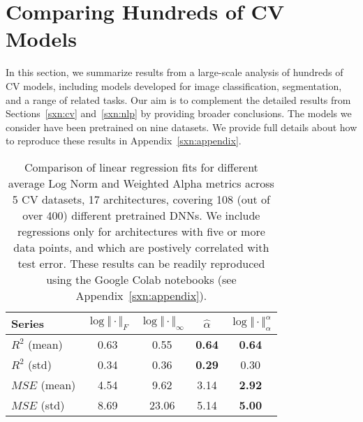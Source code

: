 \section{Comparing Hundreds of CV Models}
\label{sxn:all_cv_models}

In this section, we summarize results from a large-scale analysis of hundreds of CV models, including models developed for image 
classification, segmentation, and a range of related tasks.  
Our aim is to complement the detailed results from Sections~\ref{sxn:cv} and~\ref{sxn:nlp} by providing broader conclusions. %
The models we consider have been pretrained on nine datasets.   %
We provide full details about how to reproduce these results in Appendix~\ref{sxn:appendix}.

\begin{table}[t]
\small
\begin{center}
\begin{tabular}{|p{1in}|c|c|c|c|}
\hline
Series        & $\log\Vert\cdot\Vert_{F}$ & $\log\Vert\cdot\Vert_{\infty}$ & $\hat{\alpha}$ & $\log\Vert\cdot\Vert^{\alpha}_{\alpha}$ \\
\hline
$R^{2}$ (mean) & 0.63 &  0.55 & \textbf{0.64} & \textbf{0.64} \\
$R^{2}$ (std)  & 0.34 &  0.36 & \textbf{0.29} &          0.30 \\
\hline
$MSE$ (mean)   & 4.54 &  9.62 &          3.14 & \textbf{2.92} \\
$MSE$ (std)    & 8.69 & 23.06 &          5.14 & \textbf{5.00} \\
\hline
\end{tabular}
\end{center}
\caption{Comparison of linear regression fits for different average Log Norm and Weighted Alpha metrics across 5 CV datasets, 17 architectures, covering 108 (out of over 400) different pretrained DNNs.  
         We include regressions only for architectures with five or more data points, and which are postively correlated with test error.
         These results can be readily reproduced using the Google Colab notebooks (see Appendix~\ref{sxn:appendix}). 
        }
\label{table:results}
\end{table}


